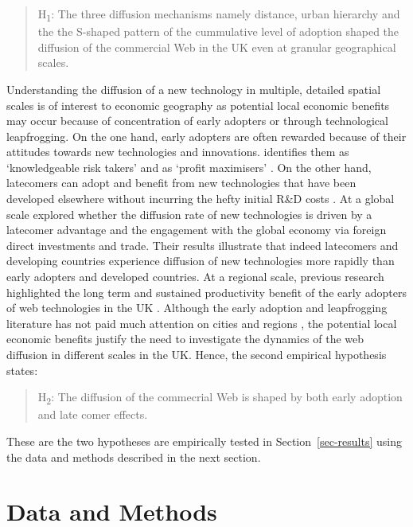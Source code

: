 \documentclass[
  authoryear,
  preprint,
  3p]{elsarticle}
\begin{document}
\begin{quote}
H\textsubscript{1}: The three diffusion mechanisms namely distance,
urban hierarchy and the the S-shaped pattern of the cummulative level of
adoption shaped the diffusion of the commercial Web in the UK even at
granular geographical scales.
\end{quote}

Understanding the diffusion of a new technology in multiple, detailed
spatial scales is of interest to economic geography as potential local
economic benefits may occur because of concentration of early adopters
or through technological leapfrogging. On the one hand, early adopters
are often rewarded because of their attitudes towards new technologies
and innovations. \citet{rogers2010diffusion} identifies them as
`knowledgeable risk takers' and \citet{griliches1957} as `profit
maximisers' \citep{ding2010modeling}. On the other hand, latecomers can
adopt and benefit from new technologies that have been developed
elsewhere without incurring the hefty initial R\&D costs
\citep{teece2008firm}. At a global scale
\citet{perkins2005international} explored whether the diffusion rate of
new technologies is driven by a latecomer advantage and the engagement
with the global economy via foreign direct investments and trade. Their
results illustrate that indeed latecomers and developing countries
experience diffusion of new technologies more rapidly than early
adopters and developed countries. At a regional scale, previous research
highlighted the long term and sustained productivity benefit of the
early adopters of web technologies in the UK \citep{tranosuk}. Although
the early adoption and leapfrogging literature has not paid much
attention on cities and regions \citep{yu2018sustainability}, the
potential local economic benefits justify the need to investigate the
dynamics of the web diffusion in different scales in the UK. Hence, the
second empirical hypothesis states:

\begin{quote}
H\textsubscript{2}: The diffusion of the commecrial Web is shaped by
both early adoption and late comer effects.
\end{quote}

These are the two hypotheses are empirically tested in
Section~\ref{sec-results} using the data and methods described in the
next section.

\section{Data and Methods}\label{sec-datamethods}
\end{document}
